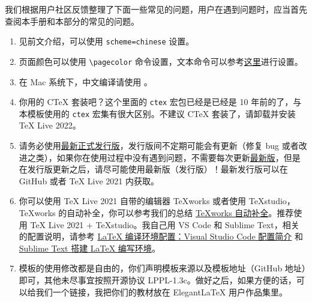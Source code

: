 \documentclass[lang=cn,10pt]{elegantbook}
\begin{document}
我们根据用户社区反馈整理了下面一些常见的问题，用户在遇到问题时，应当首先查阅本手册和本部分的常见的问题。

\begin{enumerate}[itemsep=1.5ex]
  \item {}
    见前文介绍，可以使用 \lstinline{scheme=chinese} 设置。
  \item {}
    页面颜色可以使用 \lstinline{\pagecolor} 命令设置，文本命令可以参考\href{https://tex.stackexchange.com/questions/278544/xcolor-what-is-the-equivalent-of-default-text-color}{这里}进行设置。
  \item {}
    在 Mac 系统下，中文编译请使用 。
  \item {}
    你用的 C\TeX{} 套装吧？这个里面的 \lstinline{ctex} 宏包已经是已经是 10 年前的了，与本模板使用的 \lstinline{ctex} 宏集有很大区别。不建议 C\TeX{} 套装了，请卸载并安装 \TeX{} Live 2022。
  \item {}
    请务必使用\href{https://github.com/ElegantLaTeX/ElegantBook/releases}{最新正式发行版}，发行版间不定期可能会有更新（修复 bug 或者改进之类），如果你在使用过程中没有遇到问题，不需要每次更新\href{https://github.com/ElegantLaTeX/ElegantBook/archive/master.zip}{最新版}，但是在发行版更新之后，请尽可能使用最新版（发行版）！最新发行版可以在 GitHub 或者 \TeX{} Live 2021 内获取。
  \item {}
    你可以使用 \TeX{} Live 2021 自带的编辑器 \TeX{}works 或者使用 \TeX{}studio，\TeX works 的自动补全，你可以参考我们的总结 \href{https://github.com/EthanDeng/texworks-autocomplete}{\TeX works 自动补全}。推荐使用 \TeX{} Live 2021 + \TeX{}studio。我自己用 VS Code 和 Sublime Text，相关的配置说明，请参考 \href{https://github.com/EthanDeng/vscode-latex}{\LaTeX{} 编译环境配置：Visual Studio Code 配置简介} 和 \href{https://github.com/EthanDeng/sublime-text-latex}{Sublime Text 搭建 \LaTeX{} 编写环境}。
  \item {}
    模板的使用修改都是自由的，你们声明模板来源以及模板地址（GitHub 地址）即可，其他未尽事宜按照开源协议 LPPL-1.3c。做好之后，如果方便的话，可以给我们一个链接，我把你们的教材放在 Elegant\LaTeX{} 用户作品集里。

\end{enumerate}
\end{document}
